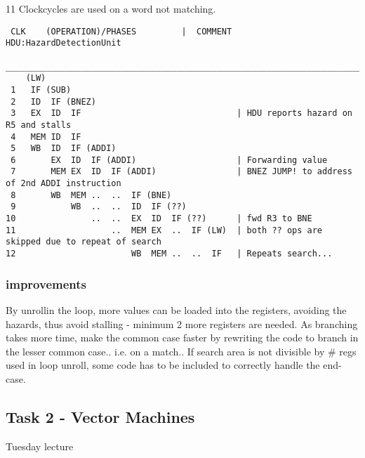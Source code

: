 \documentclass[a4paper,10pt]{article}
\begin{document}
11 Clockcycles are used on a word not matching.
\begin{verbatim}
 CLK    (OPERATION)/PHASES         |  COMMENT   HDU:HazardDetectionUnit
 ________________________________________________________________________________________________
    (LW)  
 1   IF (SUB)
 2   ID  IF (BNEZ) 
 3   EX  ID  IF                               | HDU reports hazard on R5 and stalls
 4   MEM ID  IF     
 5   WB  ID  IF (ADDI)                    
 6       EX  ID  IF (ADDI)                    | Forwarding value
 7       MEM EX  ID  IF (ADDI)                | BNEZ JUMP! to address of 2nd ADDI instruction
 8       WB  MEM ..  ..  IF (BNE)
 9           WB  ..  ..  ID  IF (??)      
10               ..  ..  EX  ID  IF (??)      | fwd R3 to BNE
11                   ..  MEM EX  ..  IF (LW)  | both ?? ops are skipped due to repeat of search
12                       WB  MEM ..  ..  IF   | Repeats search...
\end{verbatim}

\subsubsection{improvements}
By unrollin the loop, more values can be loaded into the registers, avoiding the hazards, thus avoid stalling - minimum 2 more registers are needed.
As branching takes more time, make the common case faster by rewriting the code to branch in the lesser common case.. i.e. on a match..
If search area is not divisible by # regs used in loop unroll, some code has to be included to correctly handle the end-case.

\newpage
\subsection{Task 2 - Vector Machines}
Tuesday lecture
\end{document}
